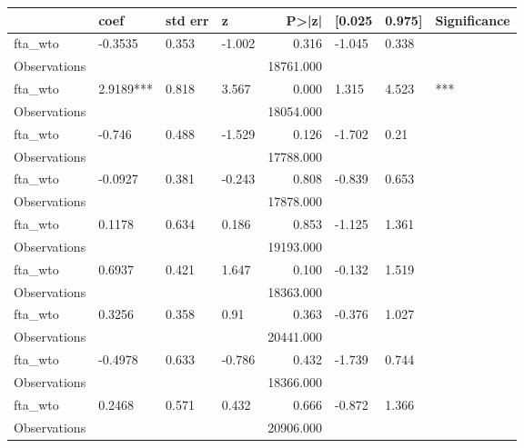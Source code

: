 \begin{tabular}{llllrlll}
\toprule
{} &       coef & std err &      z &      P>|z| & [0.025 & 0.975] & Significance \\
\midrule
fta\_wto      &    -0.3535 &   0.353 & -1.002 &      0.316 & -1.045 &  0.338 &              \\
Observations &            &         &        &  18761.000 &        &        &              \\
fta\_wto      &  2.9189*** &   0.818 &  3.567 &      0.000 &  1.315 &  4.523 &          *** \\
Observations &            &         &        &  18054.000 &        &        &              \\
fta\_wto      &     -0.746 &   0.488 & -1.529 &      0.126 & -1.702 &   0.21 &              \\
Observations &            &         &        &  17788.000 &        &        &              \\
fta\_wto      &    -0.0927 &   0.381 & -0.243 &      0.808 & -0.839 &  0.653 &              \\
Observations &            &         &        &  17878.000 &        &        &              \\
fta\_wto      &     0.1178 &   0.634 &  0.186 &      0.853 & -1.125 &  1.361 &              \\
Observations &            &         &        &  19193.000 &        &        &              \\
fta\_wto      &     0.6937 &   0.421 &  1.647 &      0.100 & -0.132 &  1.519 &              \\
Observations &            &         &        &  18363.000 &        &        &              \\
fta\_wto      &     0.3256 &   0.358 &   0.91 &      0.363 & -0.376 &  1.027 &              \\
Observations &            &         &        &  20441.000 &        &        &              \\
fta\_wto      &    -0.4978 &   0.633 & -0.786 &      0.432 & -1.739 &  0.744 &              \\
Observations &            &         &        &  18366.000 &        &        &              \\
fta\_wto      &     0.2468 &   0.571 &  0.432 &      0.666 & -0.872 &  1.366 &              \\
Observations &            &         &        &  20906.000 &        &        &              \\

\end{tabular}
